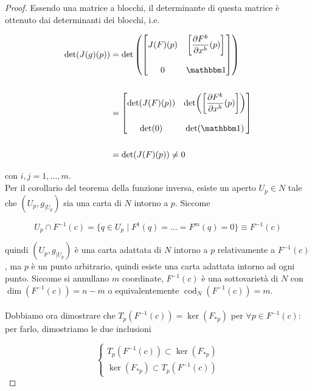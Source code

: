 \begin{proof}
	Essendo una matrice a blocchi, il determinante di questa matrice è ottenuto dai determinanti dei blocchi, i.e.
	
	\begin{align}
		\begin{split}
			\det(J(g)(p)) &= \det \left( \begin{bmatrix} J(F)(p) & \left[ \dfrac{\partial F^{k}}{\partial x^{h}} (p) \right] \\\\ 0 & \bigone \end{bmatrix} \right)\\\\
			&= \begin{bmatrix} \det(J(F)(p)) & \det( \left[ \dfrac{\partial F^{k}}{\partial x^{h}} (p) \right] ) \\\\ \det(0) & \det(\bigone) \end{bmatrix}\\\\
			&= \det(J(F)(p)) \neq 0
		\end{split}
	\end{align}

	con $ i,j=1,\dots,m $.\\
	Per il corollario del teorema della funzione inversa, esiste un aperto $ U_{p} \in N $ tale che $ (U_{p},g_{|U_{p}}) $ sia una carta di $ N $ intorno a $ p $. Siccome
	
	\begin{equation}
		U_{p} \cap F^{-1}(c) = \{ q \in U_{p} \mid F^{1}(q) = \dots = F^{m}(q) = 0 \} \equiv F^{-1}(c)
	\end{equation}

	quindi $ (U_{p},g_{|U_{p}}) $ è una carta adattata di $ N $ intorno a $ p $ relativamente a $ F^{-1}(c) $, ma $ p $ è un punto arbitrario, quindi esiste una carta adattata intorno ad ogni punto. Siccome si annullano $ m $ coordinate, $ F^{-1}(c) $ è una sottovarietà di $ N $ con $ \dim(F^{-1}(c)) = n-m $ o equivalentemente $ \operatorname{cod}_{N}(F^{-1}(c)) = m $.\\\\
	Dobbiamo ora dimostrare che $ T_{p}(F^{-1}(c)) = \ker(F_{*p}) $ per $ \forall p \in F^{-1}(c) $: per farlo, dimostriamo le due inclusioni
	
	\begin{equation}
		\begin{cases}
			T_{p}(F^{-1}(c)) \subset \ker(F_{*p})\\
			\ker(F_{*p}) \subset T_{p}(F^{-1}(c))
		\end{cases}
	\end{equation}
	

\end{proof}
